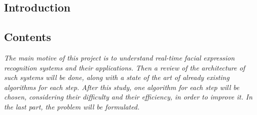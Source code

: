   \begin{titlepage}
    \vspace*{\fill}
      \part{Introduction}
    \vspace*{\fill}
  \end{titlepage}

\startcontents[parts]

\chapter*{Contents}

\textit{The main motive of this project is to understand real-time facial expression recognition systems and their applications. Then a review of the architecture of such systems will be done, along with a state of the art of already existing algorithms for each step. After this study, one algorithm for each step will be chosen, considering their difficulty and their efficiency, in order to improve it. In the last part, the problem will be formulated.}

\vspace{\baselineskip}


\pagebreak


\newpage


\stopcontents[parts]
